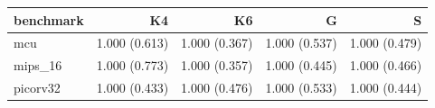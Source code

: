 \begin{tabular}{@{}lrrrr@{}}
\toprule
benchmark & K4 & K6 & G & S \\
\midrule
mcu & 1.000 (0.613) & 1.000 (0.367) & 1.000 (0.537) & 1.000 (0.479) \\
mips\_16 & 1.000 (0.773) & 1.000 (0.357) & 1.000 (0.445) & 1.000 (0.466) \\
picorv32 & 1.000 (0.433) & 1.000 (0.476) & 1.000 (0.533) & 1.000 (0.444) \\
\bottomrule
\end{tabular}

